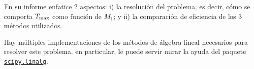 \documentclass[letter, 11pt]{article}
\begin{document}
\begin{ayuda}
  \small

  En su informe enfatice 2 aspectos: i) la resolución del problema, es decir,
  cómo se comporta $T_{\rm max}$ como función de $M_1$; y ii) la comparación de
  eficiencia de los 3 métodos utilizados.

\end{ayuda}

\begin{ayuda}
  \small

  Hay múltiples implementaciones de los métodos de álgebra lineal necesarios
  para resolver este problema, en particular, le puede servir mirar la ayuda
  del paquete
  \href{http://docs.scipy.org/doc/scipy/reference/linalg.html}{\texttt{scipy.linalg}}.
\end{ayuda}
\end{document}
